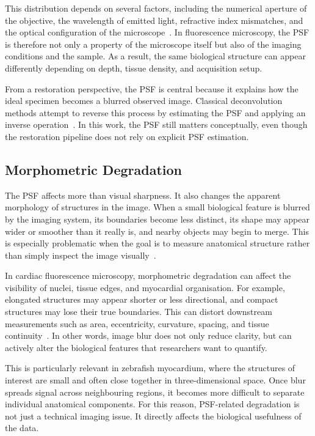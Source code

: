 This distribution depends on several factors, including the numerical aperture of the objective, the wavelength of emitted light, refractive index mismatches, and the optical configuration of the microscope~\cite{...}. In fluorescence microscopy, the PSF is therefore not only a property of the microscope itself but also of the imaging conditions and the sample. As a result, the same biological structure can appear differently depending on depth, tissue density, and acquisition setup.

From a restoration perspective, the PSF is central because it explains how the ideal specimen becomes a blurred observed image. Classical deconvolution methods attempt to reverse this process by estimating the PSF and applying an inverse operation~\cite{...}. In this work, the PSF still matters conceptually, even though the restoration pipeline does not rely on explicit PSF estimation.

\subsection{Morphometric Degradation}

The PSF affects more than visual sharpness. It also changes the apparent morphology of structures in the image. When a small biological feature is blurred by the imaging system, its boundaries become less distinct, its shape may appear wider or smoother than it really is, and nearby objects may begin to merge. This is especially problematic when the goal is to measure anatomical structure rather than simply inspect the image visually~\cite{...}.

In cardiac fluorescence microscopy, morphometric degradation can affect the visibility of nuclei, tissue edges, and myocardial organisation. For example, elongated structures may appear shorter or less directional, and compact structures may lose their true boundaries. This can distort downstream measurements such as area, eccentricity, curvature, spacing, and tissue continuity~\cite{...}. In other words, image blur does not only reduce clarity, but can actively alter the biological features that researchers want to quantify.

This is particularly relevant in zebrafish myocardium, where the structures of interest are small and often close together in three-dimensional space. Once blur spreads signal across neighbouring regions, it becomes more difficult to separate individual anatomical components. For this reason, PSF-related degradation is not just a technical imaging issue. It directly affects the biological usefulness of the data.

